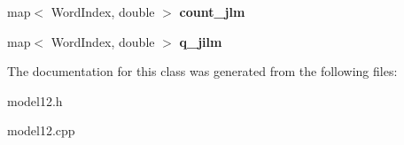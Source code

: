\begin{DoxyCompactItemize}
\item 
\hypertarget{classmodel12_aa667c161acc8945c321ba33ef688fdd3}{map$<$ \-Word\-Index, double $>$ {\bfseries count\-\_\-jlm}}\label{classmodel12_aa667c161acc8945c321ba33ef688fdd3}

\item 
\hypertarget{classmodel12_a4b81bd35c8891b87f9a37e6f8e201540}{map$<$ \-Word\-Index, double $>$ {\bfseries q\-\_\-jilm}}\label{classmodel12_a4b81bd35c8891b87f9a37e6f8e201540}

\end{DoxyCompactItemize}


\-The documentation for this class was generated from the following files\-:\begin{DoxyCompactItemize}
\item 
model12.\-h\item 
model12.\-cpp\end{DoxyCompactItemize}
